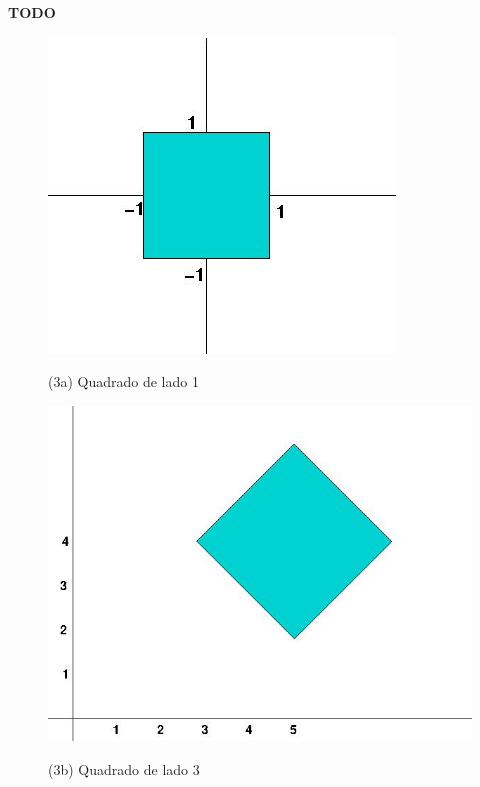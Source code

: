 \documentclass[12pt]{article}
\begin{document}
\begin{itemize}
\begin{itemize}
\textbf{TODO}

\end{itemize}
\begin{figure}[htb]
\centering
\begin{minipage}[b]{0.45\textwidth}
	\centering
        \includegraphics[scale=0.2]{Q3Images/square1.jpg} 
	\centerline{\label{fig3a} \small (3a) Quadrado de lado 1}
\end{minipage}
\begin{minipage}[b]{0.45\textwidth}
	\centering
        \includegraphics[scale=0.3]{Q3Images/square3.jpg} 
	\centerline{\label{fig3b} \small (3b) Quadrado de lado 3}
\end{minipage}
\end{figure}


\end{itemize}
\end{document}
